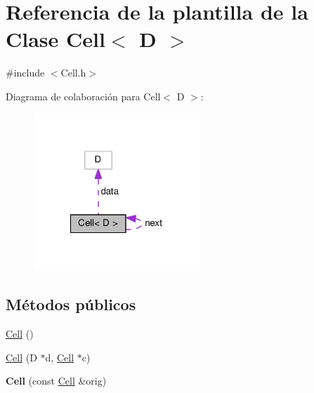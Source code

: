\hypertarget{class_cell}{\section{Referencia de la plantilla de la Clase Cell$<$ D $>$}
\label{class_cell}
}


{\ttfamily \#include $<$Cell.\-h$>$}



Diagrama de colaboración para Cell$<$ D $>$\-:\nopagebreak
\begin{figure}[H]
\begin{center}
\leavevmode
\includegraphics[width=178pt]{class_cell__coll__graph}
\end{center}
\end{figure}
\subsection*{Métodos públicos}
\begin{DoxyCompactItemize}
\item 
\hyperlink{class_cell_a742a2adf7fa420fa9cbe386a87b5c79b}{Cell} ()
\item 
\hyperlink{class_cell_aa8960323a8eeb23294419dd31349f18f}{Cell} (D $\ast$d, \hyperlink{class_cell}{Cell} $\ast$c)
\item 
\hypertarget{class_cell_a260a5d52d571c8d2f951d81df17154e2}{{\bfseries Cell} (const \hyperlink{class_cell}{Cell} \&orig)}\label{class_cell_a260a5d52d571c8d2f951d81df17154e2}

\end{DoxyCompactItemize}
